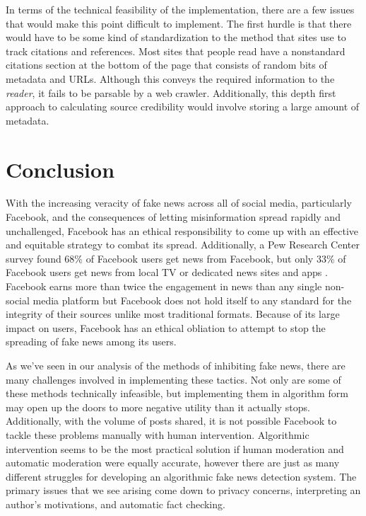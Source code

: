 \documentclass[12pt]{article}
\begin{document}
In terms of the technical feasibility of the implementation, there are a few issues that would make this point difficult to implement. The first hurdle is that there would have to be some kind of standardization to the method that sites use to track citations and references. Most sites that people read have a nonstandard citations section at the bottom of the page that consists of random bits of metadata and URLs. Although this conveys the required information to the \textit{reader}, it fails to be parsable by a web crawler. Additionally, this depth first approach to calculating source credibility would involve storing a large amount of metadata.

\section{Conclusion}

With the increasing veracity of fake news across all of social media, particularly Facebook, and the consequences of letting misinformation spread rapidly and unchallenged, Facebook has an ethical responsibility to come up with an effective and equitable strategy to combat its spread. Additionally, a Pew Research Center survey found 68\% of Facebook users get news from Facebook, but only 33\% of Facebook users get news from local TV or dedicated news sites and apps \citep{pew_news}. Facebook earns more than twice the engagement in news than any single non-social media platform but Facebook does not hold itself to any standard for the integrity of their sources unlike most traditional formats. Because of its large impact on users, Facebook has an ethical obliation to attempt to stop the spreading of fake news among its users. 

As we've seen in our analysis of the methods of inhibiting fake news, there are many challenges involved in implementing these tactics. Not only are some of these methods technically infeasible, but implementing them in algorithm form may open up the doors to more negative utility than it actually stops. Additionally, with the volume of posts shared, it is not possible Facebook to tackle these problems manually with human intervention. Algorithmic intervention seems to be the most practical solution if human moderation and automatic moderation were equally accurate, however there are just as many different struggles for developing an algorithmic fake news detection system. The primary issues that we see arising come down to privacy concerns, interpreting an author's motivations, and automatic fact checking.
\end{document}
